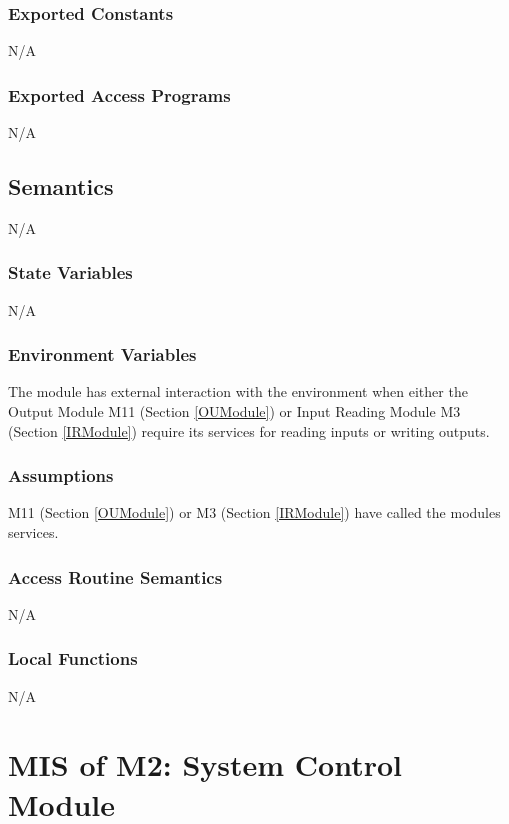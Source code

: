 \documentclass[12pt, titlepage]{article}
\begin{document}
\subsubsection{Exported Constants}
N/A

\subsubsection{Exported Access Programs}
N/A

\subsection{Semantics}
N/A

\subsubsection{State Variables}

N/A
\subsubsection{Environment Variables}

The module has external interaction with the environment when either the Output Module M11 (Section \ref{OUModule}) or Input Reading Module M3 (Section \ref{IRModule}) require its services for reading inputs or writing outputs.

\subsubsection{Assumptions}

M11 (Section \ref{OUModule}) or M3 (Section \ref{IRModule}) have called the modules services.

\subsubsection{Access Routine Semantics}
N/A

\subsubsection{Local Functions}
N/A

\newpage

\section{MIS of M2: System Control Module} \label{SCModule}
\end{document}
